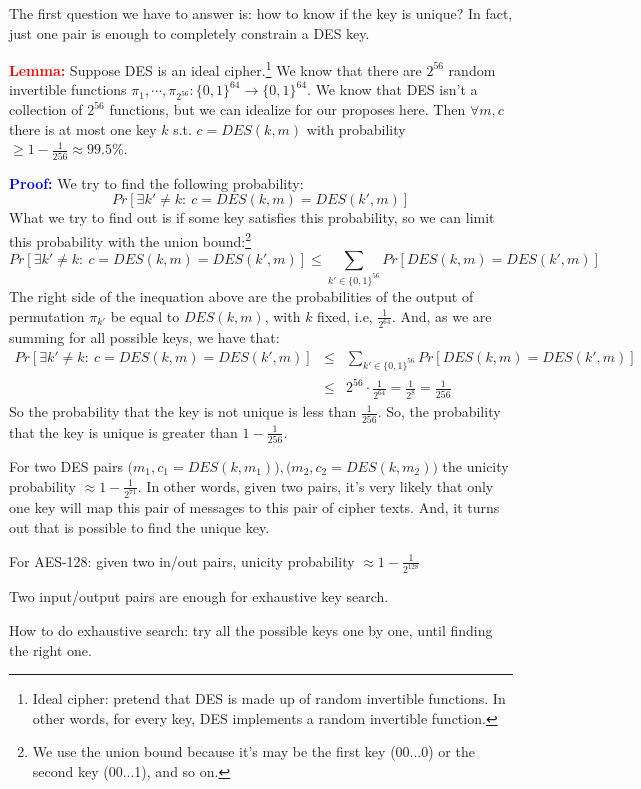 \documentclass[12pt]{book}
\newcommand{\Proof}{\textcolor{blue}{\textbf{Proof:}} }
\newcommand{\Lemma}{\textcolor{red}{\textbf{Lemma:}} }
\begin{document}
The first question we have to answer is: how to know if the key is unique? In fact, just one pair is enough to completely constrain a DES key.

\Lemma Suppose DES is an ideal cipher.\footnote{Ideal cipher: pretend that DES is made up of random invertible functions. In other words, for every key, DES implements a random invertible function.} We know that there are $2^{56}$ random invertible functions $\pi_{1},\cdots,\pi_{2^{56}}:\{0,1\}^{64}\rightarrow\{0,1\}^{64}$. We know that DES isn't a collection of $2^{56}$ functions, but we can idealize for our proposes here. Then $\forall m,c$ there is at most one key $k$ s.t. $c=DES(k,m)$ with probability $\geq 1-\frac{1}{256}\approx 99.5\%$.

\Proof We try to find the following probability:
$$Pr[\exists k'\neq k:\ c=DES(k,m)=DES(k',m)]$$What we try to find out is if some key satisfies this probability, so we can limit this probability with the union bound:\footnote{We use the union bound because it's may be the first key (00...0) or the second key (00...1), and so on.}
$$Pr[\exists k'\neq k:\ c=DES(k,m)=DES(k',m)]\leq\sum\limits_{k'\in\{0,1\}^{56}}Pr[DES(k,m)=DES(k',m)]$$The right side of the inequation above are the probabilities of the output of permutation $\pi_{k'}$ be equal to $DES(k,m)$, with $k$ fixed, i.e, $\frac{1}{2^{64}}$. And, as we are summing for all possible keys, we have that:
$$\begin{array}{rcl}
	Pr[\exists k'\neq k:\ c=DES(k,m)=DES(k',m)]&\leq&\sum\limits_{k'\in\{0,1\}^{56}}Pr[DES(k,m)=DES(k',m)]\\[0.6cm]
	&\leq&2^{56}\cdot\frac{1}{2^{64}}=\frac{1}{2^{8}}=\frac{1}{256}
\end{array}$$So the probability that the key is not unique is less than $\frac{1}{256}$. So, the probability that the key is unique is greater than $1-\frac{1}{256}$.

For two DES pairs $\big(m_{1},c_{1}=DES(k,m_{1})\big),\big(m_{2},c_{2}=DES(k,m_{2})\big)$ the unicity probability $\approx1-\frac{1}{2^{71}}$. In other words, given two pairs, it's very likely that only one key will map this pair of messages to this pair of cipher texts. And, it turns out that is possible to find the unique key.

For AES-128: given two in/out pairs, unicity probability $\approx1-\frac{1}{2^{128}}$

Two input/output pairs are enough for exhaustive key search.

How to do exhaustive search: try all the possible keys one by one, until finding the right one.
\end{document}
